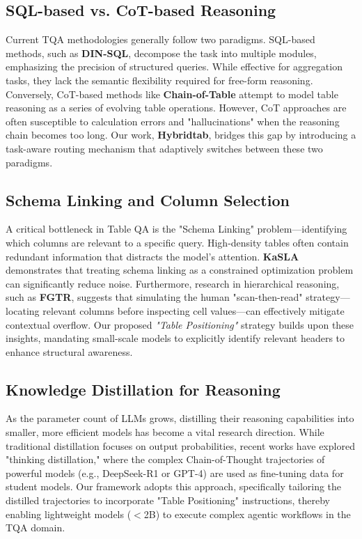\documentclass[11pt]{article}
\begin{document}
\subsection{SQL-based vs. CoT-based Reasoning}
Current TQA methodologies generally follow two paradigms. SQL-based methods, such as \textbf{DIN-SQL}, decompose the task into multiple modules, emphasizing the precision of structured queries. While effective for aggregation tasks, they lack the semantic flexibility required for free-form reasoning. Conversely, CoT-based methods like \textbf{Chain-of-Table} attempt to model table reasoning as a series of evolving table operations. However, CoT approaches are often susceptible to calculation errors and "hallucinations" when the reasoning chain becomes too long. Our work, \textbf{Hybridtab}, bridges this gap by introducing a task-aware routing mechanism that adaptively switches between these two paradigms.

\subsection{Schema Linking and Column Selection}
A critical bottleneck in Table QA is the "Schema Linking" problem—identifying which columns are relevant to a specific query. High-density tables often contain redundant information that distracts the model's attention. \textbf{KaSLA} demonstrates that treating schema linking as a constrained optimization problem can significantly reduce noise. Furthermore, research in hierarchical reasoning, such as \textbf{FGTR}, suggests that simulating the human "scan-then-read" strategy—locating relevant columns before inspecting cell values—can effectively mitigate contextual overflow. Our proposed \textit{"Table Positioning"} strategy builds upon these insights, mandating small-scale models to explicitly identify relevant headers to enhance structural awareness.

\subsection{Knowledge Distillation for Reasoning}
As the parameter count of LLMs grows, distilling their reasoning capabilities into smaller, more efficient models has become a vital research direction. While traditional distillation focuses on output probabilities, recent works have explored "thinking distillation," where the complex Chain-of-Thought trajectories of powerful models (e.g., DeepSeek-R1 or GPT-4) are used as fine-tuning data for student models. Our framework adopts this approach, specifically tailoring the distilled trajectories to incorporate "Table Positioning" instructions, thereby enabling lightweight models ($<$2B) to execute complex agentic workflows in the TQA domain.
\end{document}
